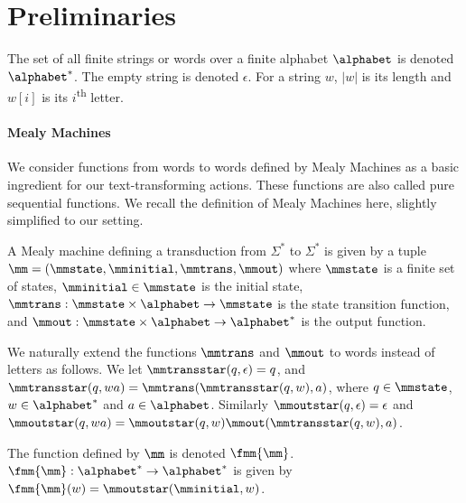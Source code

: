 
\section{Preliminaries}\label{sec:c03-preliminaries}

The set of all finite strings or words over a finite alphabet $\alphabet$ is denoted $\alphabet^\ast$. The empty string is denoted $\epsilon$. For a string $w$, $|w|$ is its length and $w[i]$ is its $i$\textsuperscript{th} letter.

\paragraph*{Mealy Machines} We consider functions from words to words defined by Mealy Machines as a basic ingredient for our text-transforming actions. These functions are also called pure sequential functions. We recall the definition of Mealy Machines here, slightly simplified to our setting. 

A Mealy machine defining a transduction from $\Sigma^\ast$ to $\Sigma^\ast$ is given by a tuple $\mm = (\mmstate, \mminitial, \mmtrans, \mmout)$ where $\mmstate$ is a finite set of states, $\mminitial \in \mmstate$ is the initial state, $\mmtrans : \mmstate \times \alphabet \to \mmstate$ is the state transition function, and $\mmout : \mmstate \times \alphabet \to \alphabet^\ast$ is the output function.

We naturally extend the functions $\mmtrans$ and $\mmout$ to words instead of letters as follows. We let $\mmtransstar(q,\epsilon) = q$, and  $\mmtransstar(q, wa) = \mmtrans(\mmtransstar(q,w), a)$, where $q \in \mmstate$, $w \in \alphabet^\ast$ and $a \in \alphabet$. Similarly $\mmoutstar(q,\epsilon) = \epsilon$ and $\mmoutstar(q,wa) = \mmoutstar(q,w)\mmout(\mmtransstar(q,w),a)$.

The function defined by $\mm$ is denoted $\fmm{\mm}$. $\fmm{\mm}: \alphabet^\ast \to \alphabet^\ast$ is given by $\fmm{\mm}(w) = \mmoutstar(\mminitial, w)$.
